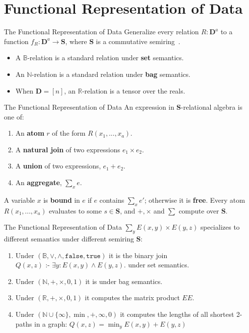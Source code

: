 \documentclass{beamer}
\newcommand{\B}{\mathbb B} %
\newcommand{\N}{\mathbb N} %
\newcommand{\R}{\mathbb R} %
\newcommand{\D}{\mathbf D} %
\newcommand{\SR}{\mathbf S} %
\newcommand{\dleq}{\mbox{ :- }}
\newcommand{\set}[1]{\{#1\}}                    %
\begin{document}
  \section{Functional Representation of Data}
  \begin{frame}{The Functional Representation of Data}
    Generalize every relation $R : \D^a$ to a function 
    $f_R : \D^a \rightarrow \SR$,
    where $\SR$ is a commutative semiring~\cite{semiring}. \pause
    \begin{itemize}
      \item A $\B$-relation is a standard relation under \textbf{set} semantics. \pause
      \item An $\N$-relation is a standard relation under \textbf{bag} semantics. \pause
      \item When $\D = [n]$, an $\R$-relation is a tensor over the reals.
    \end{itemize}
  \end{frame}

  \begin{frame}{The Functional Representation of Data}
    An expression in $\SR$-relational algebra is one of:
    \begin{enumerate}
      \item An \textbf{atom} $r$ of the form $R(x_1, ..., x_a)$.
      \item A \textbf{natural join} of two expressions $e_1 \times e_2$.
      \item A \textbf{union} of two expressions, $e_1 + e_2$.
      \item An \textbf{aggregate},  $\sum_x e$.
    \end{enumerate} \pause
    A variable $x$ is \textbf{bound} in $e$ if $e$ contains $\sum_x e'$;
    otherwise it is \textbf{free}. \pause 
    Every atom $R(x_1, ..., x_a)$ evaluates to some $s \in \SR$, and
    $+, \times$ and $\sum$ compute over $\SR$.
  \end{frame}

  \begin{frame}{The Functional Representation of Data}
    $\sum_y E(x, y) \times E(y, z)$ specializes to 
    different semantics under different semiring $\SR$:
    \begin{enumerate}
      \item Under $(\mathbb{B},\vee, \wedge, \texttt{false}, \texttt{true})$
          it is the binary join $Q(x, z) \dleq \exists y: E(x, y) \wedge E(y, z).$ 
          under set semantics. \pause
      \item Under $(\mathbb{N}, +, \times, 0, 1)$ it is under
          bag semantics. \pause
      \item Under $(\mathbb{R}, +, \times, 0, 1)$ it computes the matrix product $EE$. \pause
      \item Under $(\mathbb{N} \cup \set{\infty}, \min, +, \infty, 0)$ it computes the lengths
          of all shortest 2-paths in a graph:
          $Q(x, z) = \min_y E(x, y) + E(y, z)$
  \end{enumerate}
  \end{frame}
\end{document}
